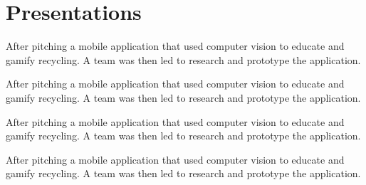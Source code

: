 \documentclass[a4paper]{deedy-resume} %
\begin{document}
\hfill
\begin{minipage}[t]{0.66\textwidth} %

\section{Presentations}


After pitching a mobile application that used computer vision to educate and gamify recycling. %
A team was then led to research and prototype the application. %

\sectionspace %



After pitching a mobile application that used computer vision to educate and gamify recycling. %
A team was then led to research and prototype the application. %

\sectionspace %



After pitching a mobile application that used computer vision to educate and gamify recycling. %
A team was then led to research and prototype the application. %

\sectionspace %



After pitching a mobile application that used computer vision to educate and gamify recycling. %
A team was then led to research and prototype the application. %


\end{minipage}
\end{document}
